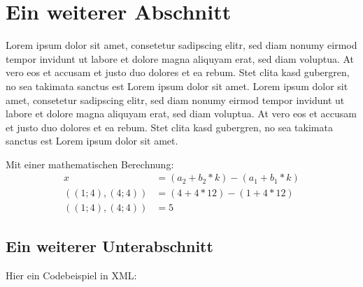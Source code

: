 \section{Ein weiterer Abschnitt}\label{sec:ein-weiterer-abschnitt}
Lorem ipsum dolor sit amet, consetetur sadipscing elitr, sed diam nonumy eirmod tempor invidunt ut labore et dolore magna aliquyam erat, sed diam voluptua. At vero eos et accusam et justo duo dolores et ea rebum. Stet clita kasd gubergren, no sea takimata sanctus est Lorem ipsum dolor sit amet. Lorem ipsum dolor sit amet, consetetur sadipscing elitr, sed diam nonumy eirmod tempor invidunt ut labore et dolore magna aliquyam erat, sed diam voluptua. At vero eos et accusam et justo duo dolores et ea rebum. Stet clita kasd gubergren, no sea takimata sanctus est Lorem ipsum dolor sit amet.

Mit einer mathematischen Berechnung:
\begin{align*}
x &= (a_{2} + b_{2} * k) - (a_{1} + b_{1} * k) \\
((1;4),(4;4)) &= (4 + 4 * 12) - (1 + 4 * 12) \\
((1;4),(4;4)) &= 5
\end{align*}

\subsection{Ein weiterer Unterabschnitt}
Hier ein Codebeispiel in XML:
\lstset{
	language=XML,
}

